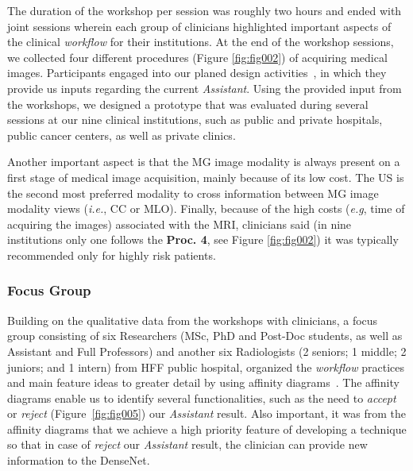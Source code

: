 
The duration of the workshop per session was roughly two hours and ended with joint sessions wherein each group of clinicians highlighted important aspects of the clinical {\it workflow} for their institutions.
At the end of the workshop sessions, we collected four different procedures (Figure \ref{fig:fig002}) of acquiring medical images.
Participants engaged into our planed design activities~\cite{https://doi.org/10.13140/rg.2.2.16566.14403/1}, in which they provide us inputs regarding the current {\it Assistant}.
Using the provided input from the workshops, we designed a prototype that was evaluated during several sessions at our nine clinical institutions, such as public and private hospitals, public cancer centers, as well as private clinics.

Another important aspect is that the MG image modality is always present on a first stage of medical image acquisition, mainly because of its low cost.
The US is the  second most preferred modality to cross information between MG image modality views ({\it i.e.}, CC or MLO).
Finally, because of the high costs ({\it e.g}, time of acquiring the images) associated with the MRI, clinicians said (in nine institutions only one follows the {\bf Proc. 4}, see Figure \ref{fig:fig002}) it was typically recommended only for highly risk patients.

\subsubsection{Focus Group}
\label{sec:focus}

Building on the qualitative data from the workshops with clinicians, a focus group consisting of six Researchers (MSc, PhD and Post-Doc students, as well as Assistant and Full Professors) and another six Radiologists (2 seniors; 1 middle; 2 juniors; and 1 intern) from HFF public hospital, organized the {\it workflow} practices and main feature ideas to greater detail by using affinity diagrams~\cite{Harboe:2012:CSC:2145204.2145379, Hoiseth:2013:RGD:2468356.2468436}.
The affinity diagrams enable us to identify several functionalities, such as the need to {\it accept} or {\it reject} (Figure~\ref{fig:fig005}) our {\it Assistant} result.
Also important, it was from the affinity diagrams that we achieve a high priority feature of developing a technique so that in case of {\it reject} our {\it Assistant} result, the clinician can provide new information to the DenseNet.

